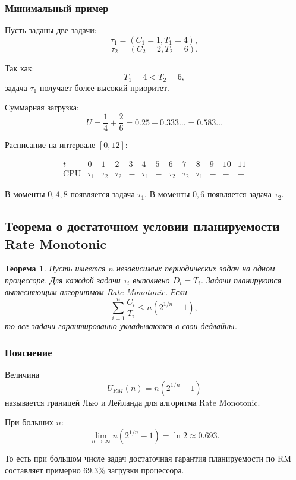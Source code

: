 \documentclass[12pt,a4paper]{article}
\newtheorem{theorem}{Теорема}
\begin{document}
\subsubsection{Минимальный пример}

Пусть заданы две задачи:
\[
    \tau_1 = (C_1 = 1, T_1 = 4),
\]
\[
    \tau_2 = (C_2 = 2, T_2 = 6).
\]

Так как:
\[
    T_1 = 4 < T_2 = 6,
\]
задача $\tau_1$ получает более высокий приоритет.

Суммарная загрузка:
\[
    U = \frac{1}{4} + \frac{2}{6}
      = 0.25 + 0.333\ldots
      = 0.583\ldots
\]

Расписание на интервале $[0,12]$:

\[
\begin{array}{c|cccccccccccc}
t        & 0 & 1 & 2 & 3 & 4 & 5 & 6 & 7 & 8 & 9 & 10 & 11 \\
\hline
\text{CPU} & \tau_1 & \tau_2 & \tau_2 & - & \tau_1 & - & \tau_2 & \tau_2 & \tau_1 & - & - & -
\end{array}
\]

В моменты $0,4,8$ появляется задача $\tau_1$.
В моменты $0,6$ появляется задача $\tau_2$.

\subsection{Теорема о достаточном условии планируемости Rate Monotonic}

\begin{theorem}
Пусть имеется $n$ независимых периодических задач на одном процессоре. Для каждой задачи $\tau_i$ выполнено $D_i = T_i$. Задачи планируются вытесняющим алгоритмом Rate Monotonic. Если
\[
    \sum_{i=1}^{n} \frac{C_i}{T_i}
    \leq
    n(2^{1/n} - 1),
\]
то все задачи гарантированно укладываются в свои дедлайны.
\end{theorem}

\subsubsection{Пояснение}

Величина
\[
    U_{RM}(n) = n(2^{1/n} - 1)
\]
называется границей Лью и Лейланда для алгоритма Rate Monotonic.

При больших $n$:
\[
    \lim_{n \to \infty} n(2^{1/n} - 1) = \ln 2 \approx 0.693.
\]

То есть при большом числе задач достаточная гарантия планируемости по RM составляет примерно $69.3\%$ загрузки процессора.
\end{document}
